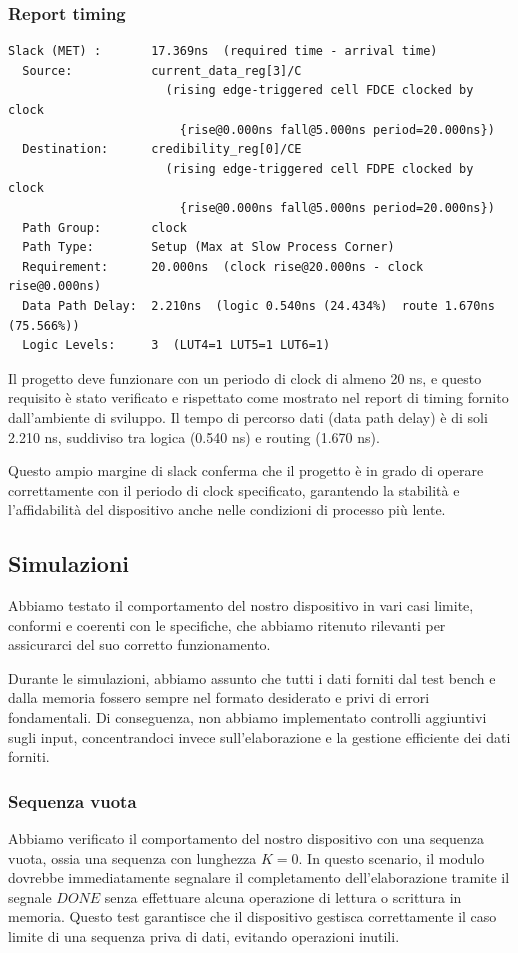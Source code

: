 \subsubsection{Report timing}
\begin{verbatim}
Slack (MET) :       17.369ns  (required time - arrival time)
  Source:           current_data_reg[3]/C
                      (rising edge-triggered cell FDCE clocked by clock
                        {rise@0.000ns fall@5.000ns period=20.000ns})
  Destination:      credibility_reg[0]/CE
                      (rising edge-triggered cell FDPE clocked by clock
                        {rise@0.000ns fall@5.000ns period=20.000ns})
  Path Group:       clock
  Path Type:        Setup (Max at Slow Process Corner)
  Requirement:      20.000ns  (clock rise@20.000ns - clock rise@0.000ns)
  Data Path Delay:  2.210ns  (logic 0.540ns (24.434%)  route 1.670ns (75.566%))
  Logic Levels:     3  (LUT4=1 LUT5=1 LUT6=1)
\end{verbatim}
\par Il progetto deve funzionare con un periodo di clock di almeno 20 ns, e questo requisito è stato verificato e rispettato come mostrato nel report di timing fornito dall'ambiente di sviluppo. Il tempo di percorso dati (data path delay) è di soli 2.210 ns, suddiviso tra logica (0.540 ns) e routing (1.670 ns).
\par Questo ampio margine di slack conferma che il progetto è in grado di operare correttamente con il periodo di clock specificato, garantendo la stabilità e l'affidabilità del dispositivo anche nelle condizioni di processo più lente.
\subsection{Simulazioni}
  \par Abbiamo testato il comportamento del nostro dispositivo in vari casi limite, conformi e coerenti con le specifiche, che abbiamo ritenuto rilevanti per assicurarci del suo corretto funzionamento.
  \par Durante le simulazioni, abbiamo assunto che tutti i dati forniti dal test bench e dalla memoria fossero sempre nel formato desiderato e privi di errori fondamentali. Di conseguenza, non abbiamo implementato controlli aggiuntivi sugli input, concentrandoci invece sull'elaborazione e la gestione efficiente dei dati forniti.
\subsubsection{Sequenza vuota}
  Abbiamo verificato il comportamento del nostro dispositivo con una sequenza vuota, ossia una sequenza con lunghezza $K=0$.
  In questo scenario, il modulo dovrebbe immediatamente segnalare il completamento dell'elaborazione tramite il segnale $DONE$ senza effettuare alcuna operazione di lettura o scrittura in memoria.
  Questo test garantisce che il dispositivo gestisca correttamente il caso limite di una sequenza priva di dati, evitando operazioni inutili.
